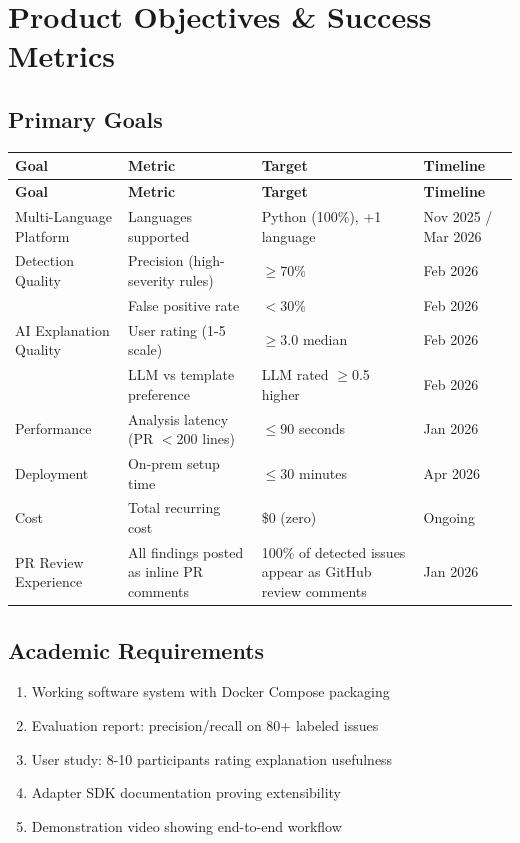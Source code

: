 \documentclass[11pt,a4paper]{article}
\begin{document}
\section{Product Objectives \& Success Metrics}

\subsection{Primary Goals}

\begin{longtable}{p{3.5cm}p{3.5cm}p{2.5cm}p{2.5cm}}
\toprule
\textbf{Goal} & \textbf{Metric} & \textbf{Target} & \textbf{Timeline} \\
\midrule
\endfirsthead
\toprule
\textbf{Goal} & \textbf{Metric} & \textbf{Target} & \textbf{Timeline} \\
\midrule
\endhead
Multi-Language Platform & Languages supported & Python (100\%), +1 language & Nov 2025 / Mar 2026 \\
\midrule
Detection Quality & Precision (high-severity rules) & $\geq$70\% & Feb 2026 \\
& False positive rate & $<$30\% & Feb 2026 \\
\midrule
AI Explanation Quality & User rating (1-5 scale) & $\geq$3.0 median & Feb 2026 \\
& LLM vs template preference & LLM rated $\geq$0.5 higher & Feb 2026 \\
\midrule
Performance & Analysis latency (PR $<$200 lines) & $\leq$90 seconds & Jan 2026 \\
\midrule
Deployment & On-prem setup time & $\leq$30 minutes & Apr 2026 \\
\midrule
Cost & Total recurring cost & \$0 (zero) & Ongoing \\
\midrule
PR Review Experience & All findings posted as inline PR comments & 100\% of detected issues appear as GitHub review comments & Jan 2026 \\
\bottomrule
\end{longtable}

\subsection{Academic Requirements}
\begin{enumerate}
    \item Working software system with Docker Compose packaging
    \item Evaluation report: precision/recall on 80+ labeled issues
    \item User study: 8-10 participants rating explanation usefulness
    \item Adapter SDK documentation proving extensibility
    \item Demonstration video showing end-to-end workflow
\end{enumerate}
\end{document}
